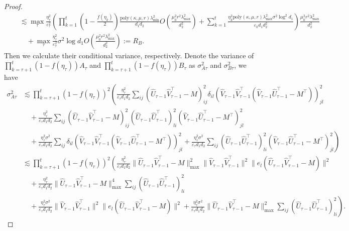 \documentclass[12pt]{article}
\theoremstyle{plain}
\begin{document}
\begin{proof}
\begin{align*}
    &\quad \lesssim \max_{\tau}\frac{\eta_{\tau}^2}{\varepsilon_{\tau}^2} \left(\prod_{k=1}^{t}(1-\frac{f(\eta_k)}{2})\frac{\text{poly}(\kappa,\mu,r)\lambda_{\min}^2}{d_1d_2} O(\frac{\mu_0^2r^2\lambda_{\max}^2}{d_2^2}) + \sum_{k=1}^{t} \frac{\eta_{k}^2\text{poly}(\kappa,\mu,r)\lambda_{\max}^2\sigma^2\log^2d_1}{\varepsilon_{k} d_1d_2^2}\right) \frac{\mu_0^2r^2\lambda_{\max}^2}{d_2^2} \\ &\quad\quad + \max_{\tau}\frac{\eta_{\tau}^2}{\varepsilon_{\tau}^2}\sigma^2\log d_1O(\frac{\mu_0^2r^2\lambda_{\max}^2}{d_2^2}) := R_B.
\end{align*}
Then we calculate their conditional variance, respectively. Denote the variance of $\prod_{k=\tau+1}^{t}(1-f(\eta_{\tau}))A_{\tau}$ and $\prod_{k=\tau+1}^{t}(1-f(\eta_{\tau}))B_{\tau}$ as $\sigma_{A\tau}^2$ and $\sigma_{B\tau}^2$, we have  
\begin{align*}
    \sigma_{A\tau}^2&\lesssim \prod_{k=\tau+1}^{t}(1-f(\eta_{\tau}))^2\left(\frac{\eta_{\tau}^2}{\varepsilon_{\tau}d_1d_2}\sum_{ij}(\widehat{U}_{\tau-1}\widehat{V}_{\tau-1}^{\top} - M)_{ij}^2\delta_{il}(\widehat{V}_{\tau-1}\widehat{V}_{\tau-1}^{\top}(\widehat{V}_{\tau-1}\widehat{U}_{\tau-1}^{\top}-M^{\top}))_{jl}^2 \right.\\ &\left.\quad + \frac{\eta_{\tau}^2}{\varepsilon_{\tau} d_1d_2}\sum_{ij}(\widehat{U}_{\tau-1}\widehat{V}_{\tau-1}^{\top} - M)_{ij}^2(\widehat{U}_{\tau-1}\widehat{U}_{\tau-1}^{\top})_{li}^2(\widehat{V}_{\tau-1}\widehat{U}_{\tau-1}^{\top}-M^{\top})_{jl}^2 \right.\\ &\left.\quad + \frac{\eta_{\tau}^2\sigma^2}{\varepsilon_{\tau}d_1d_2}\sum_{ij}\delta_{il}(\widehat{V}_{\tau-1}\widehat{V}_{\tau-1}^{\top}(\widehat{V}_{\tau-1}\widehat{U}_{\tau-1}^{\top}-M^{\top}))_{jl}^2 + \frac{\eta_{\tau}^2\sigma^2}{\varepsilon_{\tau}d_1d_2}\sum_{ij}(\widehat{U}_{\tau-1}\widehat{U}_{\tau-1}^{\top})_{li}^2(\widehat{V}_{\tau-1}\widehat{U}_{\tau-1}^{\top}-M^{\top})_{jl}^2\right)\\
    &\lesssim \prod_{k=\tau+1}^{t}(1-f(\eta_{\tau}))^2\left(\frac{\eta_{\tau}^2}{\varepsilon_{\tau}d_1d_2}\|\widehat{U}_{\tau-1}\widehat{V}_{\tau-1}^{\top} - M\|_{\max}^2\|\widehat{V}_{\tau-1}\widehat{V}_{\tau-1}^{\top}\|^2\|e_l(\widehat{U}_{\tau-1}\widehat{V}_{\tau-1}^{\top}-M)\|^2 \right.\\ &\left.\quad + \frac{\eta_{\tau}^2}{\varepsilon_{\tau} d_1d_2}\|\widehat{U}_{\tau-1}\widehat{V}_{\tau-1}^{\top} - M\|_{\max}^4\sum_{ij}(\widehat{U}_{\tau-1}\widehat{U}_{\tau-1}^{\top})_{li}^2 \right.\\ &\left.\quad + \frac{\eta_{\tau}^2\sigma^2}{\varepsilon_{\tau}d_1d_2}\|\widehat{V}_{\tau-1}\widehat{V}_{\tau-1}^{\top}\|^2\|e_l(\widehat{U}_{\tau-1}\widehat{V}_{\tau-1}^{\top}-M)\|^2  + \frac{\eta_{\tau}^2\sigma^2}{\varepsilon_{\tau}d_1d_2}\|\widehat{U}_{\tau-1}\widehat{V}_{\tau-1}^{\top} - M\|_{\max}^2\sum_{ij}(\widehat{U}_{\tau-1}\widehat{U}_{\tau-1}^{\top})_{li}^2\right).

\end{align*}
\end{proof}
\end{document}
